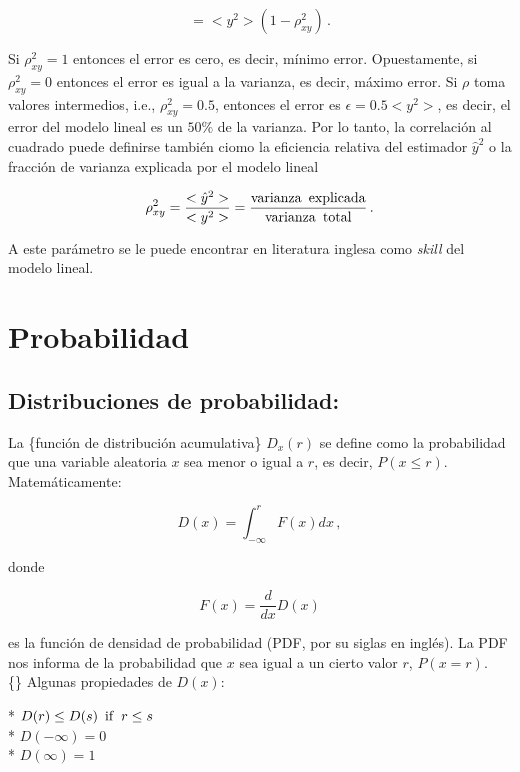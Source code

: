 \documentclass[
]{agujournal2019}
\begin{document}
\[=<y^2>(1-\rho^2_{xy})\,.\]

Si \(\rho^2_{xy}=1\) entonces el error es cero, es decir, mínimo error.
Opuestamente, si \(\rho^2_{xy}=0\) entonces el error es igual a la
varianza, es decir, máximo error. Si \(\rho\) toma valores intermedios,
i.e., \(\rho^2_{xy}=0.5\), entonces el error es \(\epsilon=0.5<y^2>\),
es decir, el error del modelo lineal es un \(50\%\) de la varianza. Por
lo tanto, la correlación al cuadrado puede definirse también ciomo la
eficiencia relativa del estimador \(\hat{y}^2\) o la fracción de
varianza explicada por el modelo lineal

\[\rho^2_{xy}=\frac{<\hat{y}^2>}{<y^2>}=\frac{{\rm varianza\,\,\,explicada}}{{\rm varianza\,\,\,total}}\,.\]

A este parámetro se le puede encontrar en literatura inglesa como
\emph{skill} del modelo lineal.

\hypertarget{probabilidad}{%
\section{Probabilidad}\label{probabilidad}}

\vspace{0.5cm}

\hypertarget{distribuciones-de-probabilidad}{%
\subsection{Distribuciones de
probabilidad:}\label{distribuciones-de-probabilidad}}

La \{función de distribución acumulativa\} \(D_x(r)\) se define como la
probabilidad que una variable aleatoria \(x\) sea menor o igual a \(r\),
es decir, \(P(x\le r)\). Matemáticamente:

\[D(x)=\int^r_{-\infty}F(x)dx\,,\]

donde

\[F(x)=\frac{d}{dx} D(x)\]

es la función de densidad de probabilidad (PDF, por su siglas en
inglés). La PDF nos informa de la probabilidad que \(x\) sea igual a un
cierto valor \(r\), \(P(x=r)\).\\

\{\noindent\} Algunas propiedades de \(D(x)\):

\hfill\break
* \(D(r)\le D(s)\,\,\,{\rm if}\,\,\,r\le s\)\\
* \(D(-\infty)=0\)\\
* \(D(\infty)=1\)\\
\end{document}
